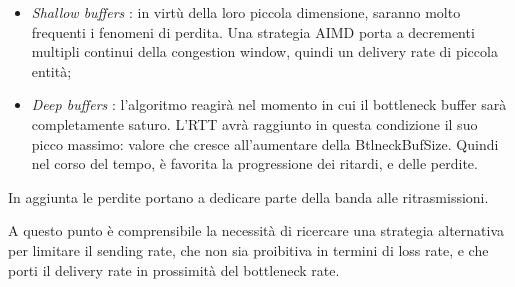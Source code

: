 \begin{itemize}

\item \textit{Shallow buffers} : in virtù della loro piccola dimensione, saranno molto frequenti i fenomeni di perdita. Una strategia AIMD porta a decrementi multipli continui della congestion window, quindi un delivery rate di piccola entità;

\item \textit{Deep buffers} : l'algoritmo reagirà nel momento in cui il bottleneck buffer sarà completamente saturo. L'RTT avrà raggiunto in questa condizione il suo picco massimo: valore che cresce all'aumentare della BtlneckBufSize. 
Quindi nel corso del tempo, è favorita la progressione dei ritardi, e delle perdite.

\end{itemize}

In aggiunta le perdite portano a dedicare parte della banda alle ritrasmissioni. \bigskip

A questo punto è comprensibile la necessità di ricercare una strategia alternativa per limitare il sending rate, che non sia proibitiva in termini di loss rate, e che porti il delivery rate in prossimità del bottleneck rate.